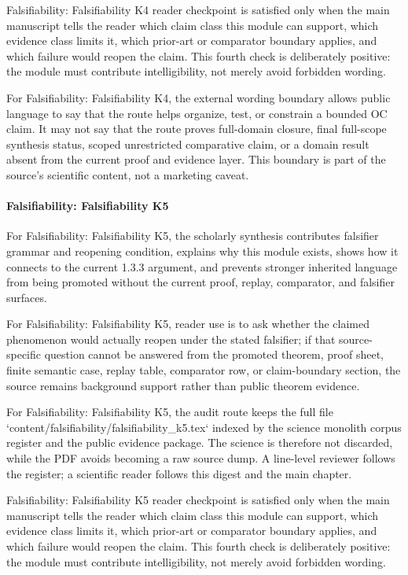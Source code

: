 Falsifiability: Falsifiability K4 reader checkpoint is satisfied only when the main manuscript tells the reader which claim class this module can support, which evidence class limits it, which prior-art or comparator boundary applies, and which failure would reopen the claim. This fourth check is deliberately positive: the module must contribute intelligibility, not merely avoid forbidden wording.


For Falsifiability: Falsifiability K4, the external wording boundary allows public language to say that the route helps organize, test, or constrain a bounded OC claim. It may not say that the route proves full-domain closure, final full-scope synthesis status, scoped unrestricted comparative claim, or a domain result absent from the current proof and evidence layer. This boundary is part of the source's scientific content, not a marketing caveat.


\paragraph{Falsifiability: Falsifiability K5}

For Falsifiability: Falsifiability K5, the scholarly synthesis contributes falsifier grammar and reopening condition, explains why this module exists, shows how it connects to the current 1.3.3 argument, and prevents stronger inherited language from being promoted without the current proof, replay, comparator, and falsifier surfaces.


For Falsifiability: Falsifiability K5, reader use is to ask whether the claimed phenomenon would actually reopen under the stated falsifier; if that source-specific question cannot be answered from the promoted theorem, proof sheet, finite semantic case, replay table, comparator row, or claim-boundary section, the source remains background support rather than public theorem evidence.


For Falsifiability: Falsifiability K5, the audit route keeps the full file `content/falsifiability/falsifiability\_k5.tex` indexed by the science monolith corpus register and the public evidence package. The science is therefore not discarded, while the PDF avoids becoming a raw source dump. A line-level reviewer follows the register; a scientific reader follows this digest and the main chapter.


Falsifiability: Falsifiability K5 reader checkpoint is satisfied only when the main manuscript tells the reader which claim class this module can support, which evidence class limits it, which prior-art or comparator boundary applies, and which failure would reopen the claim. This fourth check is deliberately positive: the module must contribute intelligibility, not merely avoid forbidden wording.


